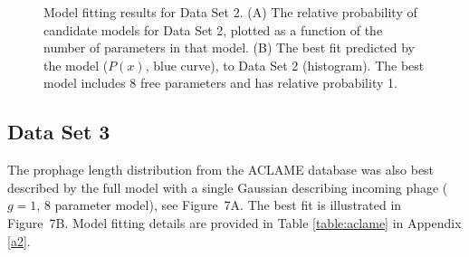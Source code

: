 \begin{figure}[H]
\begin{subfigure}[t]{0.5\textwidth}
\end{subfigure}\hfill
\caption[Model fitting results for Data Set 2.]{ Model fitting results for Data Set 2. (A) The relative probability of candidate models for Data Set 2, plotted as a function of the number of parameters in that model.  (B) The best fit predicted by the model ($P(x)$, blue curve), to Data Set 2 (histogram). The best model includes 8 free parameters and has relative probability 1. 
}
\end{figure}
\subsection{Data Set 3} 
The prophage length distribution from the ACLAME database was also best described by the full model with a single Gaussian describing incoming phage ($g=1$, 8 parameter model), see Figure~7A.
The best fit is illustrated in
Figure~7B.
Model fitting details are provided in Table \ref{table:aclame} in Appendix \ref{a2}. 
